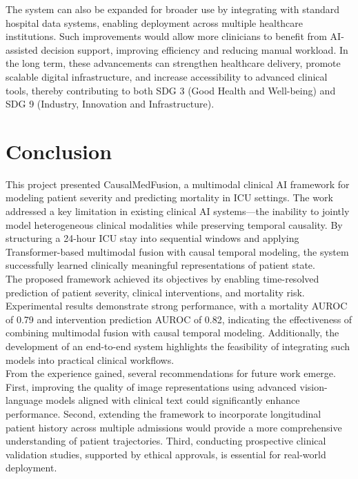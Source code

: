 \documentclass{fisatprojectfinal}
\begin{document}
The system can also be expanded for broader use by integrating with standard hospital data systems, enabling deployment across multiple healthcare institutions. Such improvements would allow more clinicians to benefit from AI-assisted decision support, improving efficiency and reducing manual workload. In the long term, these advancements can strengthen healthcare delivery, promote scalable digital infrastructure, and increase accessibility to advanced clinical tools, thereby contributing to both SDG 3 (Good Health and Well-being) and SDG 9 (Industry, Innovation and Infrastructure).

\chapter{Conclusion}
This project presented CausalMedFusion, a multimodal clinical AI framework for modeling patient severity and predicting mortality in ICU settings. The work addressed a key limitation in existing clinical AI systems—the inability to jointly model heterogeneous clinical modalities while preserving temporal causality. By structuring a 24-hour ICU stay into sequential windows and applying Transformer-based multimodal fusion with causal temporal modeling, the system successfully learned clinically meaningful representations of patient state.\\

The proposed framework achieved its objectives by enabling time-resolved prediction of patient severity, clinical interventions, and mortality risk. Experimental results demonstrate strong performance, with a mortality AUROC of 0.79 and intervention prediction AUROC of 0.82, indicating the effectiveness of combining multimodal fusion with causal temporal modeling. Additionally, the development of an end-to-end system highlights the feasibility of integrating such models into practical clinical workflows. \\

From the experience gained, several recommendations for future work emerge. First, improving the quality of image representations using advanced vision-language models aligned with clinical text could significantly enhance performance. Second, extending the framework to incorporate longitudinal patient history across multiple admissions would provide a more comprehensive understanding of patient trajectories. Third, conducting prospective clinical validation studies, supported by ethical approvals, is essential for real-world deployment.\\
\end{document}
